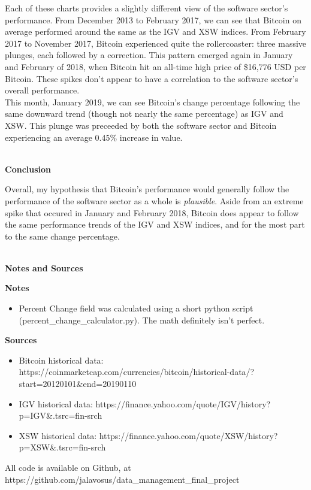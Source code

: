\documentclass[12pt]{article}
\begin{document}
\par Each of these charts provides a slightly different view of the software sector's performance. From December 2013 to February 2017, we can see that Bitcoin on average performed around the same as the IGV and XSW indices. From February 2017 to November 2017, Bitcoin experienced quite the rollercoaster: three massive plunges, each followed by a correction. This pattern emerged again in January and February of 2018, when Bitcoin hit an all-time high price of \$16,776 USD per Bitcoin. These spikes don't appear to have a correlation to the software sector's overall performance.
\pagebreak \\
This month, January 2019, we can see Bitcoin's change percentage following the same downward trend (though not nearly the same percentage) as IGV and XSW. This plunge was preceeded by both the software sector and Bitcoin experiencing an average 0.45\% increase in value. 

\begin{center}
\LARGE \textbf{\\Conclusion}
\end{center}

Overall, my hypothesis that Bitcoin's performance would generally follow the performance of the software sector as a whole is \textit{plausible}. Aside from an extreme spike that occured in January and February 2018, Bitcoin does appear to follow the same performance trends of the IGV and XSW indices, and for the most part to the same change percentage. 

\begin{center}
\LARGE \textbf{\\ Notes and Sources}
\end{center}

\begin{flushleft}

\begin{large}
\textbf{Notes}
\end{large}

\begin{itemize}
\item Percent Change field was calculated using a short python script (percent\_change\_calculator.py). The math definitely isn't perfect.
\end{itemize}

\begin{large}
\textbf{Sources}
\end{large}

\begin{itemize}
\item Bitcoin historical data: https://coinmarketcap.com/currencies/bitcoin/historical-data/?start=20120101\&end=20190110
\item IGV historical data: https://finance.yahoo.com/quote/IGV/history?p=IGV\&.tsrc=fin-srch
\item XSW historical data: https://finance.yahoo.com/quote/XSW/history?p=XSW\&.tsrc=fin-srch
\end{itemize}

All code is available on Github, at https://github.com/jalavosus/data\_management\_final\_project

\end{flushleft}
\end{document}
